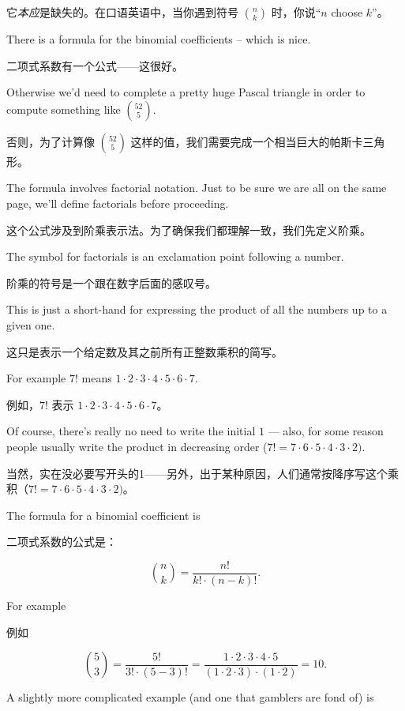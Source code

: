 它\emph{本应}是缺失的。在口语英语中，当你遇到符号 $\displaystyle \binom{n}{k}$ 时，你说“$n$ choose $k$”。

There is a formula for the binomial coefficients -- which is nice.

二项式系数有一个公式——这很好。

Otherwise
we'd need to complete a pretty huge Pascal triangle in order to compute
something like $\displaystyle \binom{52}{5}$.

否则，为了计算像 $\displaystyle \binom{52}{5}$ 这样的值，我们需要完成一个相当巨大的帕斯卡三角形。

The formula involves 
 factorial notation.  Just to be sure we are 
all on the same page, we'll define factorials before proceeding.

这个公式涉及到阶乘表示法。为了确保我们都理解一致，我们先定义阶乘。

The symbol for factorials is an exclamation point following a number.

阶乘的符号是一个跟在数字后面的感叹号。

This is just a short-hand for expressing the
product of all the numbers up to a given one.

这只是表示一个给定数及其之前所有正整数乘积的简写。

For example $7!$ means $1\cdot 2\cdot 3\cdot 4\cdot 5\cdot 6\cdot 7$.

例如，$7!$ 表示 $1\cdot 2\cdot 3\cdot 4\cdot 5\cdot 6\cdot 7$。

Of course, there's really no need to write the initial $1$ --- also,
for some reason people usually write the product in decreasing order
($7! = 7 \cdot 6 \cdot 5 \cdot 4 \cdot 3 \cdot 2)$.

当然，实在没必要写开头的1——另外，出于某种原因，人们通常按降序写这个乘积（$7! = 7 \cdot 6 \cdot 5 \cdot 4 \cdot 3 \cdot 2)$。

The formula for a binomial coefficient is 

二项式系数的公式是：

\[ \binom{n}{k} = \frac{n!}{k! \cdot (n-k)!}. \]

For example

例如

\[ \binom{5}{3} = \frac{5!}{3! \cdot (5-3)!} = \frac{1\cdot 2\cdot 3\cdot 4\cdot 5}{(1\cdot 2\cdot 3) \cdot (1\cdot 2)} = 10. \]

A slightly more complicated example (and one that gamblers are fond of) 
is

